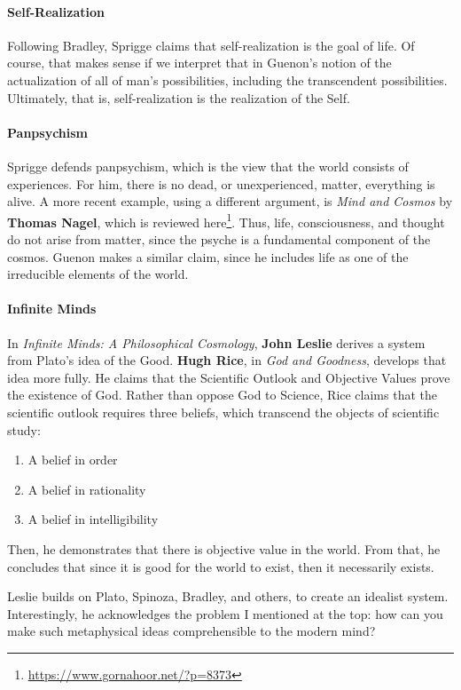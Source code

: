 \paragraph{Self-Realization}
Following Bradley, Sprigge claims that self-realization is the goal of life. Of course, that makes sense if we interpret
that in Guenon's notion of the actualization of all of man's possibilities, including the
transcendent possibilities. Ultimately, that is, self-realization is the realization of the Self.

\paragraph{Panpsychism}
Sprigge defends panpsychism, which is the view that the world consists of experiences. For him, there is no dead, or
unexperienced, matter, everything is alive. A more recent example, using a different argument, is \emph{Mind and
Cosmos} by \textbf{Thomas Nagel}, which is reviewed here\footnote{\url{https://www.gornahoor.net/?p=8373}}. Thus, life, consciousness, and thought do not arise from
matter, since the psyche is a fundamental component of the cosmos. Guenon makes a similar claim, since he includes life
as one of the irreducible elements of the world.

\paragraph{Infinite Minds}
In \emph{Infinite Minds: A Philosophical Cosmology}, \textbf{John Leslie} derives a system from Plato's idea
of the Good. \textbf{Hugh Rice}, in \emph{God and Goodness}, develops that idea more fully. He claims that the
Scientific Outlook and Objective Values prove the existence of God. Rather than oppose God to Science, Rice claims that
the scientific outlook requires three beliefs, which transcend the objects of scientific study:

\begin{enumerate}
\item A belief in order 
\item A belief in rationality 
\item A belief in intelligibility 
\end{enumerate}
Then, he demonstrates that there is objective value in the world. From that, he concludes that since it is good for the
world to exist, then it necessarily exists.

Leslie builds on Plato, Spinoza, Bradley, and others, to create an idealist system. Interestingly, he acknowledges the
problem I mentioned at the top: how can you make such metaphysical ideas comprehensible to the modern mind?

